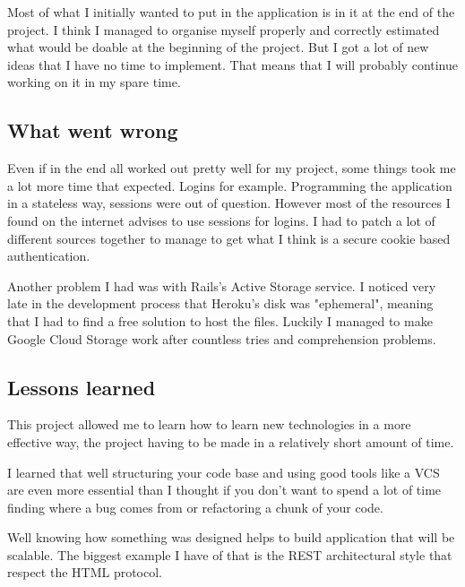 \documentclass[12pt,a4paper]{article}
\begin{document}
Most of what I initially wanted to put in the application is in it at the end
of the project. I think I managed to organise myself properly and correctly
estimated what would be doable at the beginning of the project. But I got a lot
of new ideas that I have no time to implement. That means that I will probably
continue working on it in my spare time.

\subsection{What went wrong}

Even if in the end all worked out pretty well for my project, some things took me
a lot more time that expected. Logins for example. Programming the application
in a stateless way, sessions were out of question. However most of the
resources I found on the internet advises to use sessions for logins. I had to
patch a lot of different sources together to manage to get what I think is a
secure cookie based authentication.

Another problem I had was with Rails's Active Storage service. I noticed very
late in the development process that Heroku's disk was "ephemeral", meaning
that I had to find a free solution to host the files. Luckily I managed to make
Google Cloud Storage work after countless tries and comprehension problems.

\subsection{Lessons learned}

This project allowed me to learn how to learn new technologies in a more effective
way, the project having to be made in a relatively short amount of time.

I learned that well structuring your code base and using good tools like a VCS
are even more essential than I thought if you don't want to spend a lot of time
finding where a bug comes from or refactoring a chunk of your code.

Well knowing how something was designed helps to build application that will be
scalable. The biggest example I have of that is the REST architectural style
that respect the HTML protocol.
\end{document}
